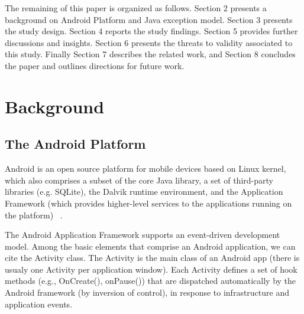 \documentclass[conference]{IEEEtran}
\begin{document}

The remaining of this paper is organized as follows. Section 2 presents a
background on Android Platform and Java exception model. 
Section 3 presents the study design. Section 4 reports the study findings. 
Section 5 provides further discussions and insights.
Section 6 presents the threats to validity associated to this study. Finally Section
7 describes the related work, and Section 8 concludes the paper and outlines
directions for future work.

\section{Background}
\label{sec:back}

\subsection{The Android Platform} \label{sec:extypes}
Android is an open source platform for mobile devices based on Linux kernel,
which also comprises a subset of the core Java library, a set of third-party libraries (e.g.  SQLite),
the Dalvik runtime environment, and the Application Framework (which provides 
higher-level services to the applications running on the platform) ~\cite{andguide}.


The Android Application Framework supports an event-driven development model. 
Among the basic elements that comprise an Android application, we can cite the
 Activity class. The Activity is the main class of an Android app (there is usualy one
Activity per application window). Each Activity defines a set of hook methods  
(e.g., OnCreate(), onPause()) that are dispatched automatically by the Android 
framework (by inversion of control), in response to infrastructure and application events.
\end{document}
